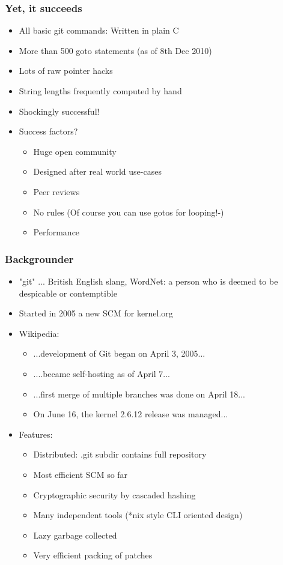 \begin{slide}
  \frametitle{Yet, it succeeds}
  \begin{itemize}
    \item All basic git commands: Written in plain C
    \item More than 500 goto statements (as of 8th Dec 2010)
    \item Lots of raw pointer hacks
    \item String lengths frequently computed by hand
    \item Shockingly successful!
    \item Success factors?
    \begin{itemize}
      \item Huge open community
      \item Designed after real world use-cases
      \item Peer reviews
      \item No rules (Of course you can use gotos for looping!-)
      \item Performance
    \end{itemize}
  \end{itemize}
\end{slide}

\begin{slide}
  \frametitle{Backgrounder}
  \begin{itemize}
    \item "git" ... British English slang, WordNet: a person who is deemed to be despicable or contemptible
    \item Started in 2005 a new SCM for kernel.org
    \item Wikipedia:
    \begin{itemize}
      \item ...development of Git began on April 3, 2005...
      \item ....became self-hosting as of April 7...
      \item ...first merge of multiple branches was done on April 18...
      \item On June 16, the kernel 2.6.12 release was managed...
    \end{itemize}
    \item Features:
    \begin{itemize}
      \item Distributed: .git subdir contains full repository
      \item Most efficient SCM so far
      \item Cryptographic security by cascaded hashing
      \item Many independent tools (*nix style CLI oriented design)
      \item Lazy garbage collected
      \item Very efficient packing of patches
    \end{itemize}
  \end{itemize}
\end{slide}
